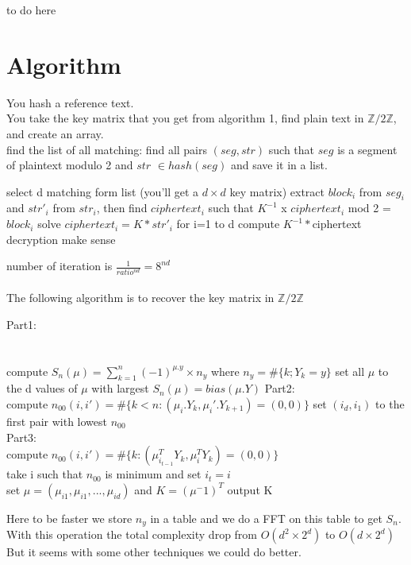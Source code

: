 \documentclass{article}
\begin{document}
to do here

\appendix
\newpage
\section{Algorithm}

You hash a reference text.\\
You take the key matrix that you get from algorithm 1, find plain text in $\mathbb{Z}/2\mathbb{Z}$, and create an array.\\
find the list of all matching: find all pairs $(seg,str)$ such that $seg$ is a segment of plaintext modulo 2 and $str$ $\in hash(seg)$ and save it in a list.\\
\begin{algorithmic}[1]
	\REPEAT
\STATE select d matching form list (you'll get a $d\times d$ key matrix)
	\STATE extract $block_{i}$ from $seg_{i}$ and $str'_{i}$ from $str_{i}$,
	\STATE then find $ciphertext_{i}$ such that $K^{-1}$ x $ciphertext_{i}$ mod 2 = $block_{i}$
\ENDFOR
\STATE solve $ciphertext_{i} = K * str'_{i}$ for i=1 to d
\STATE compute $K^{-1} * $ciphertext
\UNTIL decryption make sense
\end{algorithmic}
number of iteration is $ \frac{1}{ratio^{nd}} = 8^{nd}$
\\
\\
The following algorithm is to recover the key matrix in $\mathbb{Z}/2\mathbb{Z}$\\
\begin{algorithmic}[1]
\STATE Part1:\\
\\
\\
\FORALL{$\mu$}
	\STATE compute $S_n(\mu) = \sum_{k=1}^{n}{(-1)^{\mu.y} \times n_y}$ where $n_y=\#\{k;Y_k=y\}$
\ENDFOR
\STATE set all $\mu$ to the d values of $\mu$ with largest $S_n(\mu)=bias(\mu.Y)$
\STATE Part2:\\
	\STATE compute $n_{00}(i,i')=\#\{k<n:(\mu_i .Y_k,\mu_i'.Y_{k+1})=(0,0)\}$
\ENDFOR
\STATE set $(i_d,i_1)$ to the first pair with lowest $n_{00}$
\\
\STATE Part3:\\
		\STATE compute $n_{00}(i,i{'})=\#\{k:(\mu^{T}_{i_{t-1}}Y_{k},\mu^{T}_{i}Y_{k})=(0,0)\}$\\
	\ENDFOR
	\STATE take i such that $n_{00}$ is minimum and set $i_t=i$\\
\ENDFOR
\STATE set $\mu = (\mu_{i1},\mu_{i1},...,\mu_{id})$ and $K=(\mu^-1)^T$
\STATE output K
\end{algorithmic}
Here to be faster we store $n_y$ in a table and we do a FFT on this table to get $S_n$. With this operation the total complexity drop from $O(d^2 \times 2^d)$ to $O(d \times 2^d)$
But it seems with some other techniques we could do better.
\end{document}
